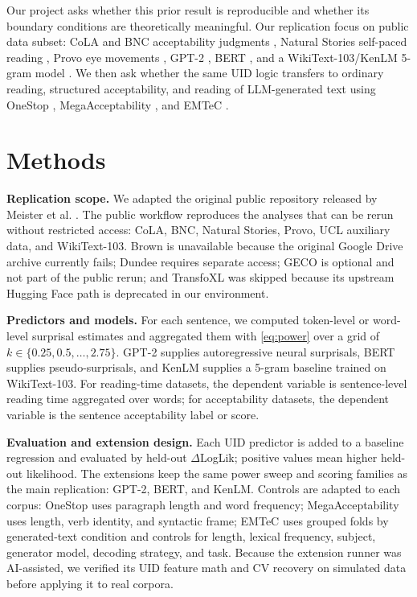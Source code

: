 \documentclass{article}
\begin{document}
Our project asks whether this prior result is reproducible and whether its boundary conditions are theoretically meaningful. Our replication focus on public data subset: CoLA \cite{warstadt2019} and BNC acceptability judgments \cite{lau2017}, Natural Stories self-paced reading \cite{futrell2018}, Provo eye movements \cite{luke2018}, GPT-2 \cite{radford2019}, BERT \cite{devlin2019}, and a WikiText-103/KenLM 5-gram model \cite{merity2017,heafield2011}. We then ask whether the same UID logic transfers to ordinary reading, structured acceptability, and reading of LLM-generated text using OneStop \cite{berzak2025}, MegaAcceptability \cite{whiteRawlins2020}, and EMTeC \cite{bolliger2025}.

\section{Methods}

\textbf{Replication scope.} We adapted the original public repository released by Meister et al. \cite{meister2021}. The public workflow reproduces the analyses that can be rerun without restricted access: CoLA, BNC, Natural Stories, Provo, UCL auxiliary data, and WikiText-103. Brown is unavailable because the original Google Drive archive currently fails; Dundee requires separate access; GECO is optional and not part of the public rerun; and TransfoXL was skipped because its upstream Hugging Face path is deprecated in our environment.

\textbf{Predictors and models.} For each sentence, we computed token-level or word-level surprisal estimates and aggregated them with \cref{eq:power} over a grid of $k \in \{0.25,0.5,\ldots,2.75\}$. GPT-2 supplies autoregressive neural surprisals, BERT supplies pseudo-surprisals, and KenLM supplies a 5-gram baseline trained on WikiText-103. For reading-time datasets, the dependent variable is sentence-level reading time aggregated over words; for acceptability datasets, the dependent variable is the sentence acceptability label or score.

\textbf{Evaluation and extension design.} Each UID predictor is added to a baseline regression and evaluated by held-out $\Delta$LogLik; positive values mean higher held-out likelihood. The extensions keep the same power sweep and scoring families as the main replication: GPT-2, BERT, and KenLM. Controls are adapted to each corpus: OneStop uses paragraph length and word frequency; MegaAcceptability uses length, verb identity, and syntactic frame; EMTeC uses grouped folds by generated-text condition and controls for length, lexical frequency, subject, generator model, decoding strategy, and task. Because the extension runner was AI-assisted, we verified its UID feature math and CV recovery on simulated data before applying it to real corpora.
\end{document}
